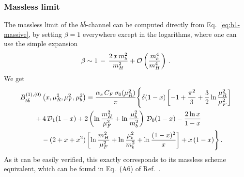 \subsubsection{Massless limit}
The massless limit of the $b\bar{b}$-channel can be computed directly
from Eq.~\eqref{eq:b1-massive},
by setting $\beta=1$ everywhere except in the logarithms, where
one can use the simple expansion
\begin{equation}
  \label{eq:beta}
  \beta \sim 1\,-\,\frac{2\,x\,m_b^2}{m_H^2} + {\cal O}\left( \frac{m_b^4}{m_H^4} \right)\,.
\end{equation}
We get
\begin{equation}
  \label{eq:b1-massless}
  \begin{split}
    B_{b\bar{b}}^{(1),(0)}&\left(x,\mu_R^2,\mu_F^2,\mu_b^2 \right) = 
    \frac{\alpha_s \, C_F\,\sigma_0(\mu_R^2)}{\pi}
    \Biggl\{
      \delta(1-x)\left[ -1+ \frac{\pi^2}{3} + \frac{3}{2}
          \ln\frac{\mu_R^2}{\mu_F^2} \right] \\+&\,4\,{\cal
        D}_1(1-x) 
      +  2\left( 
      \ln{\frac{m_H^2}{\mu_F^2}}+ \ln{\frac{\mu_b^2}{m_b^2}}\right)\,{\cal D}_0(1-x)
      -\frac{2\ln x}{1-x}  \\
      &- (2 + x + x^2)\left[
        \ln\frac{m_H^2}{\mu_F^2} +\ln{\frac{\mu_b^2}{m_b^2}} + \ln \frac{(1-x)^2}{x}\right]+ x\,(1-x)  \Biggr\}\,.
  \end{split} 
\end{equation}
As it can be easily verified, this exactly corresponds to its massless
scheme equivalent, which can be found in Eq.~(A6) of Ref.~\cite{Harlander:2003ai}.
